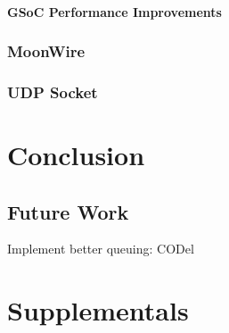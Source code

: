 \documentclass[IN,11pt,twoside,openright,master,english]{tumthesis}
\begin{document}
		\subsubsection{GSoC Performance Improvements}
	\subsection{MoonWire}
	\subsection{UDP Socket}

\chapter{Conclusion}
\label{chap:conclusion}
\section{Future Work}
	Implement better queuing: CODel

\appendix
\chapter{Supplementals}

\listoffigures
\listoftables



\printacronyms[heading=chapter,name=List of Acronyms]
\clearpage
\pagestyle{thesischapter}

\cleardoublepage
\printbibliography[heading=bibintoc]

\clearpage
\pagestyle{empty}
\end{document}
